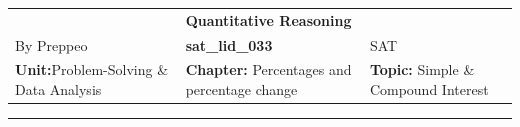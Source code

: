 \documentclass[11pt,paper=a4,answers]{exam}
\begin{document}
\begin{center}
    \centering
    \renewcommand{\arraystretch}{1.5}
    \begin{tabularx}{\textwidth}{YYY}
    & \normalsize\bf{{\Large{{Quantitative Reasoning}}}} & \\
    By Preppeo & \normalsize\bf{{sat\_lid\_033}} & SAT\\
    \normalsize{{\textbf{{Unit:}}Problem-Solving \& Data Analysis}} & \normalsize{{\textbf{{Chapter:}} Percentages and percentage change}} & \normalsize{{\textbf{{Topic:}} Simple \& Compound Interest}} \\
    \end{tabularx}
\end{center}
\par\noindent\rule{\textwidth}{1pt}
\end{document}
